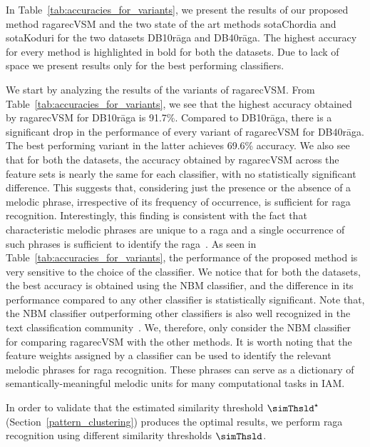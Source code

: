 In Table~\ref{tab:accuracies_for_variants}, we present the results of our proposed method \acrshort{ragarecVSM} and the two state of the art methods \acrshort{sotaChordia} and \acrshort{sotaKoduri} for the two datasets DB10r\={a}ga and DB40r\={a}ga. The highest accuracy for every method is highlighted in bold for both the datasets. Due to lack of space we present results only for the best performing classifiers. 

We start by analyzing the results of the variants of \acrshort{ragarecVSM}. From Table~\ref{tab:accuracies_for_variants}, we see that the highest accuracy obtained by \acrshort{ragarecVSM} for DB10r\={a}ga is 91.7\%. Compared to DB10r\={a}ga, there is a significant drop in the performance of every variant of \acrshort{ragarecVSM} for DB40r\={a}ga. The best performing variant in the latter achieves 69.6\% accuracy. We also see that for both the datasets, the accuracy obtained by \acrshort{ragarecVSM} across the feature sets is nearly the same for each classifier, with no statistically significant difference. This suggests that, considering just the presence or the absence of a melodic phrase, irrespective of its frequency of occurrence, is sufficient for \gls{raga} recognition. Interestingly, this finding is consistent with the fact that characteristic melodic phrases are unique to a \gls{raga} and a single occurrence of such phrases is sufficient to identify the \gls{raga}~\cite{krishna2012carnatic}. As seen in Table~\ref{tab:accuracies_for_variants}, the performance of the proposed method is very sensitive to the choice of the classifier. We notice that for both the datasets, the best accuracy is obtained using the NBM classifier, and the difference in its performance compared to any other classifier is statistically significant. Note that, the NBM classifier outperforming other classifiers is also well recognized in the text classification community~\cite{mccallum1998comparison}. We, therefore, only consider the NBM classifier for comparing \acrshort{ragarecVSM} with the other methods. It is worth noting that the feature weights assigned by a classifier can be used to identify the relevant melodic phrases for \gls{raga} recognition. These phrases can serve as a dictionary of semantically-meaningful melodic units for many computational tasks in IAM.

In order to validate that the estimated similarity threshold $\simThsld^\star$ (Section~\ref{pattern_clustering}) produces the optimal results, we perform \gls{raga} recognition using different similarity thresholds $\simThsld$. 

